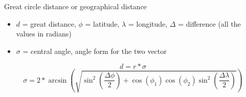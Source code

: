 Great circle distance or geographical distance
\begin{itemize}
\item $d$ = great distance, $\phi$ = latitude, $\lambda$ = longitude, $\Delta$ = difference (all the values in radians)
\item $\sigma$ = central angle, angle form for the two vector
\end{itemize}

$$d = r * \sigma$$ $$\sigma = 2 * \arcsin(\sqrt{\sin^2(\frac{\Delta\phi}{2}) + \cos(\phi_1)\cos(\phi_2)\sin^2(\frac{\Delta\lambda}{2})})$$